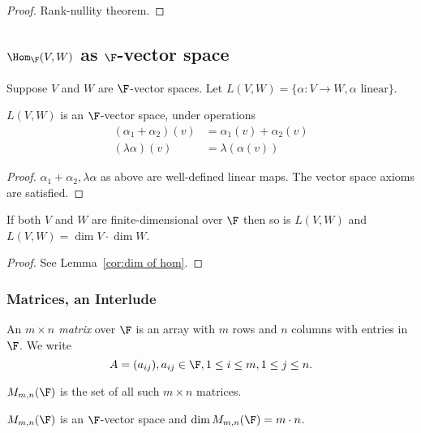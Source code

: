 \documentclass[a4paper]{article}
\theoremstyle{definition}
\begin{document}
\begin{proof}
  Rank-nullity theorem.
\end{proof}

\subsection{\(\Hom_\F(V,W)\) as \(\F\)-vector space}

Suppose \(V\) and \(W\) are \(\F\)-vector spaces. Let \(L(V,W) = \{\alpha:V\to W, \alpha \text{ linear}\}\).

\begin{prop}
  \(L(V,W)\) is an \(\F\)-vector space, under operations
  \begin{align*}
    (\alpha_1+\alpha_2)(v) &= \alpha_1(v) + \alpha_2(v) \\
    (\lambda\alpha)(v) &= \lambda(\alpha(v))
  \end{align*}
\end{prop}

\begin{proof}
  \(\alpha_1+\alpha_2, \lambda\alpha\) as above are well-defined linear maps. The vector space axioms are satisfied.
\end{proof}

\begin{prop}
  \label{prop:dimension of linear map space}
  If both \(V\) and \(W\) are finite-dimensional over \(\F\) then so is \(L(V,W)\) and \(L(V,W) = \dim V \cdot \dim W\).
\end{prop}

\begin{proof}
  See Lemma~\ref{cor:dim of hom}.
\end{proof}

\subsubsection{Matrices, an Interlude}

\begin{defi}
  An \emph{\(m\times n\) matrix} over \(\F\) is an array with \(m\) rows and \(n\) columns with entries in \(\F\). We write
  \[
A = (a_{ij}), a_{ij}\in\F, 1\leq i \leq m, 1\leq j \leq n.
  \]
\end{defi}

\begin{defi}
  \(M_{m,n}(\F)\) is the set of all such \(m\times n\) matrices.
\end{defi}

\begin{prop}
  \(M_{m,n}(\F)\) is an \(\F\)-vector space and \(\dim M_{m,n}(\F) = m\cdot n\).
\end{prop}
\end{document}
